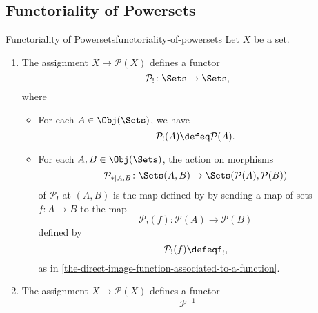 \subsection{Functoriality of Powersets}\label{subsection-functoriality-of-powersets}
\begin{proposition}{Functoriality of Powersets}{functoriality-of-powersets}%
    Let $X$ be a set.
    \begin{enumerate}
        \item\label{functoriality-of-powersets-functoriality-1}The assignment $X\mapsto\mathcal{P}(X)$ defines a functor
            \[
                \mathcal{P}_{!}%
                \colon%
                \Sets%
                \to%
                \Sets,%
            \]%
            where
            \begin{itemize}
                \item{}For each $A\in\Obj(\Sets)$, we have
                    \[
                        \mathcal{P}_{!}(A)%
                        \defeq%
                        \mathcal{P}(A).%
                    \]%
                \item{}For each $A,B\in\Obj(\Sets)$, the action on morphisms
                    \[
                        \mathcal{P}_{*|A,B}%
                        \colon%
                        \Sets(A,B)%
                        \to%
                        \Sets(\mathcal{P}(A),\mathcal{P}(B))%
                    \]%
                    of $\mathcal{P}_{!}$ at $(A,B)$ is the map defined by by sending a map of sets $f\colon A\to B$ to the map
                    \[
                        \mathcal{P}_{!}(f)%
                        \colon%
                        \mathcal{P}(A)%
                        \to%
                        \mathcal{P}(B)%
                    \]%
                    defined by
                    \[
                        \mathcal{P}_{!}(f)%
                        \defeq%
                        f_{!},%
                    \]%
                    as in \cref{the-direct-image-function-associated-to-a-function}.
            \end{itemize}
        \item\label{functoriality-of-powersets-functoriality-2}The assignment $X\mapsto\mathcal{P}(X)$ defines a functor
            \[
                \mathcal{P}^{-1}%
\]
\end{enumerate}
\end{proposition}
